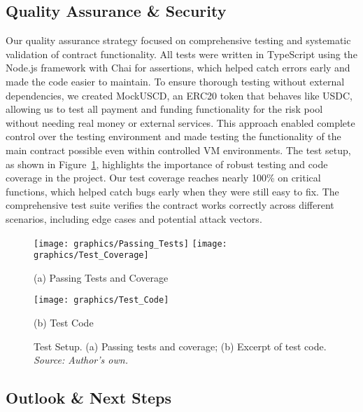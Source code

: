 \documentclass[11pt,a4paper]{article}
\begin{document}
	\subsection{Quality Assurance \& Security}\label{subsec:qa-security}
	Our quality assurance strategy focused on comprehensive testing and systematic validation of contract functionality.
	All tests were written in TypeScript using the Node.js framework with Chai for assertions, which helped catch errors early and made the code easier to maintain.
	To ensure thorough testing without external dependencies, we created MockUSCD, an ERC20 token that behaves like USDC, allowing us to test all payment and funding functionality for the risk pool without needing real money or external services.
	This approach enabled complete control over the testing environment and made testing the functionality of the main contract possible even within controlled VM environments.
	The test setup, as shown in Figure~\ref{fig:test-set-up}, highlights the importance of robust testing and code coverage in the project.
	Our test coverage reaches nearly 100\% on critical functions, which helped catch bugs early when they were still easy to fix.
	The comprehensive test suite verifies the contract works correctly across different scenarios, including edge cases and potential attack vectors.

	\begin{figure}[H]
		\centering
		\begin{minipage}[b]{0.48\textwidth}
			\centering
			\texttt{[image: graphics/Passing\_Tests]}
			\texttt{[image: graphics/Test\_Coverage]}
			\caption*{(a) Passing Tests and Coverage}
		\end{minipage}\hfill
		\begin{minipage}[b]{0.48\textwidth}
			\centering
			\texttt{[image: graphics/Test\_Code]}
			\caption*{(b) Test Code}
		\end{minipage}
		\caption{Test Setup. (a) Passing tests and coverage; (b) Excerpt of test code. \\ \textit{Source: Author's own.}}
		\label{fig:test-set-up}
	\end{figure}


	\subsection{Outlook \& Next Steps}\label{subsec:outlook}
\end{document}
